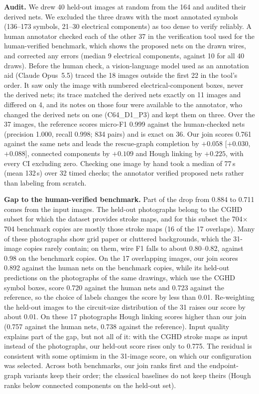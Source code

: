 \documentclass{ieeeaccess}
\begin{document}
\textbf{Audit.} We drew 40 held-out images at random from the 164 and audited their derived nets. We excluded the three draws with the most annotated symbols (136--173 symbols, 21--30 electrical components) as too dense to verify reliably. A human annotator checked each of the other 37 in the verification tool used for the human-verified benchmark, which shows the proposed nets on the drawn wires, and corrected any errors (median 9 electrical components, against 10 for all 40 draws). Before the human check, a vision-language model used as an annotation aid (Claude Opus~5.5) traced the 18 images outside the first 22 in the tool's order. It saw only the image with numbered electrical-component boxes, never the derived nets; its trace matched the derived nets exactly on 11 images and differed on 4, and its notes on those four were available to the annotator, who changed the derived nets on one (C64\_D1\_P3) and kept them on three. Over the 37 images, the reference scores micro-F1 0.999 against the human-checked nets (precision 1.000, recall 0.998; 834 pairs) and is exact on 36. Our join scores 0.761 against the same nets and leads the rescue-graph completion by $+0.058$ [$+0.030$, $+0.088$], connected components by $+0.109$ and Hough linking by $+0.225$, with every CI excluding zero. Checking one image by hand took a median of 77\,s (mean 132\,s) over 32 timed checks; the annotator verified proposed nets rather than labeling from scratch.

\textbf{Gap to the human-verified benchmark.} Part of the drop from 0.884 to 0.711 comes from the input images. The held-out photographs belong to the CGHD subset for which the dataset provides stroke maps, and for this subset the 704$\times$704 benchmark copies are mostly those stroke maps (16 of the 17 overlaps). Many of these photographs show grid paper or cluttered backgrounds, which the 31-image copies rarely contain; on them, wire F1 falls to about 0.80--0.82, against 0.98 on the benchmark copies. On the 17 overlapping images, our join scores 0.892 against the human nets on the benchmark copies, while its held-out predictions on the photographs of the same drawings, which use the CGHD symbol boxes, score 0.720 against the human nets and 0.723 against the reference, so the choice of labels changes the score by less than 0.01. Re-weighting the held-out images to the circuit-size distribution of the 31 raises our score by about 0.01. On these 17 photographs Hough linking scores higher than our join (0.757 against the human nets, 0.738 against the reference). Input quality explains part of the gap, but not all of it: with the CGHD stroke maps as input instead of the photographs, our held-out score rises only to 0.775. The residual is consistent with some optimism in the 31-image score, on which our configuration was selected. Across both benchmarks, our join ranks first and the endpoint-graph variants keep their order; the classical baselines do not keep theirs (Hough ranks below connected components on the held-out set).
\end{document}
